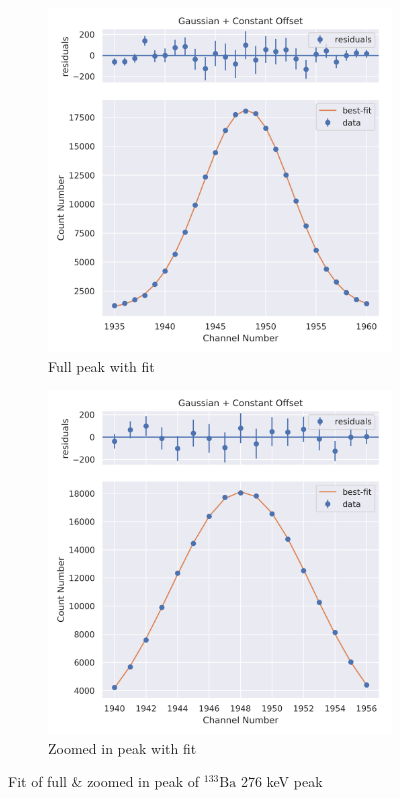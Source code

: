 \documentclass[11pt,a4paper]{article}
\newcommand{\element}[2]{$^{#2}\textrm{#1}$}
\begin{document}
\begin{figure}[H]
  \centering
  \begin{subfigure}{.5\linewidth}
    \centering
    \includegraphics[width=\linewidth]{./Images/Barium133/Gauss/Gauss_4_Full.png}
    \caption{Full peak with fit}
  \end{subfigure}%
  \begin{subfigure}{.5\linewidth}
    \centering
    \includegraphics[width=\linewidth]{./Images/Barium133/Gauss/Gauss_4_Zoom.png}
    \caption{Zoomed in peak with fit}
  \end{subfigure}
  \caption{Fit of full \& zoomed in peak of \element{Ba}{133} 276 keV peak}
\end{figure}
\end{document}
